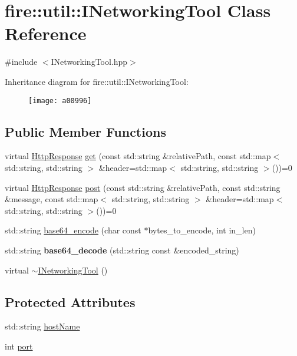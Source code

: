 \hypertarget{a00996}{}\section{fire\+:\+:util\+:\+:I\+Networking\+Tool Class Reference}
\label{a00996}


{\ttfamily \#include $<$I\+Networking\+Tool.\+hpp$>$}

Inheritance diagram for fire\+:\+:util\+:\+:I\+Networking\+Tool\+:\begin{figure}[H]
\begin{center}
\leavevmode
\texttt{[image: a00996]}
\end{center}
\end{figure}
\subsection*{Public Member Functions}
\begin{DoxyCompactItemize}
\item 
virtual \hyperlink{a00992}{Http\+Response} \hyperlink{a00996_a44b81ebf8421f0e32ed99b5e372ef007}{get} (const std\+::string \&relative\+Path, const std\+::map$<$ std\+::string, std\+::string $>$ \&header=std\+::map$<$ std\+::string, std\+::string $>$())=0
\item 
virtual \hyperlink{a00992}{Http\+Response} \hyperlink{a00996_ad6ff0e352d78f17a6f6184d1b80e0c94}{post} (const std\+::string \&relative\+Path, const std\+::string \&message, const std\+::map$<$ std\+::string, std\+::string $>$ \&header=std\+::map$<$ std\+::string, std\+::string $>$())=0
\item 
std\+::string \hyperlink{a00996_ab93be61530f01e64cb3c688976a6887b}{base64\+\_\+encode} (char const $\ast$bytes\+\_\+to\+\_\+encode, int in\+\_\+len)
\item 
\mbox{\label{a00996_ae050106ca2338332893606cea2f3881a}} 
std\+::string {\bfseries base64\+\_\+decode} (std\+::string const \&encoded\+\_\+string)
\item 
virtual \hyperlink{a00996_a2beca71d6ecb1688809f0e5e0548c17c}{$\sim$\+I\+Networking\+Tool} ()
\end{DoxyCompactItemize}
\subsection*{Protected Attributes}
\begin{DoxyCompactItemize}
\item 
std\+::string \hyperlink{a00996_ab7380b440faa49daffb65ca030380cde}{host\+Name}
\item 
int \hyperlink{a00996_ae640954c85632932a88037375a95abf4}{port}
\end{DoxyCompactItemize}


